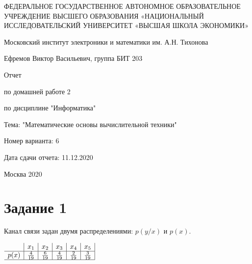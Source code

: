 \documentclass[a4paper,12pt]{article}
\begin{document}
\renewcommand{\arraystretch}{1.5}



\large
\begin{titlepage}
\begin{center}
ФЕДЕРАЛЬНОЕ ГОСУДАРСТВЕННОЕ АВТОНОМНОЕ ОБРАЗОВАТЕЛЬНОЕ УЧРЕЖДЕНИЕ ВЫСШЕГО ОБРАЗОВАНИЯ «НАЦИОНАЛЬНЫЙ ИССЛЕДОВАТЕЛЬСКИЙ УНИВЕРСИТЕТ «ВЫСШАЯ ШКОЛА ЭКОНОМИКИ»

\vspace{1cm}

Московский институт электроники и математики им. А.Н. Тихонова

\vspace{2cm}

Ефремов Виктор Васильевич, группа БИТ 203

\vspace{4cm}

Отчет

по домашней работе 2

\vspace{1cm}

по дисциплине "Информатика"

Тема: "Математические основы вычислительной техники"

\vspace{1cm}

Номер варианта: 6

Дата сдачи отчета: 11.12.2020

\vfill

Москва
2020
\end{center}
\end{titlepage}
\normalsize

\setcounter{page}{2}

\section*{Задание 1}

Канал связи задан двумя распределениями: $p(y / x)$ и $p(x)$.

\begin{table}[h]
$\begin{array}{c *{5}{|c} |}
& x_1 & x_2 & x_3 & x_4 & x_5 \\ \hline
p(x) & \frac{4}{19} & \frac{6}{19} & \frac{4}{19} & \frac{2}{19} & \frac{3}{19} \\ \hline
\end{array}$
\caption{$p(x)$}
\end{table}
\end{document}
